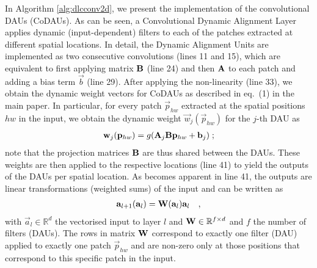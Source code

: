 In Algorithm \ref{alg:dlcconv2d}, we present the implementation of the convolutional DAUs (CoDAUs).
As can be seen, a Convolutional Dynamic Alignment Layer applies dynamic (input-dependent) filters to each of the patches extracted at different spatial locations. In detail, the Dynamic Alignment Units are implemented as two consecutive convolutions (lines 11 and 15), which are equivalent to first applying matrix $\mat B$ (line 24) and then $\mat A$ to each patch and adding a bias term $\vec b$ (line 29).
After applying the non-linearity (line 33), we obtain the dynamic weight vectors for CoDAUs as described in eq.~(1) in the main paper.
In particular, for every patch $\vec p_{hw}$ extracted at the spatial positions $hw$ in the input, we obtain the dynamic weight $\vec w_j(\vec p_{hw})$ for the $j$-th DAU as
\begin{align}
    \vec w_j(\vec p_{hw}) = g(\mat{a}_j\mat{b}\vec p_{hw} + \vec b_j)\; ;
\end{align}
note that the projection matrices $\mat b$ are thus shared between the DAUs.
These weights are then applied to the respective locations (line 41) to yield the outputs of the DAUs per spatial location.
As becomes apparent in line 41, the outputs are linear transformations (weighted sums) of the input and can be written as
\begin{align}
    \vec a_{l+1}(\vec a_l) = \mat W(\vec a_l) \vec a_l\quad ,
\end{align}
with $\vec a_l\in \mathbb R^{d}$ the vectorised input to layer $l$ and $\mat w\in\mathbb R^{f\times d}$ and $f$ the number of filters (DAUs).
The rows in matrix $\mat w$ correspond to exactly one filter (DAU) applied to exactly one patch $\vec p_{hw}$ and are non-zero only at those positions that correspond to this specific patch in the input.
